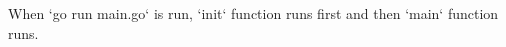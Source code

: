 \documentclass[../../main.tex]{subfiles}
\begin{document}


When `go run main.go` is run, `init` function runs first and then `main` function runs.






\end{document}
